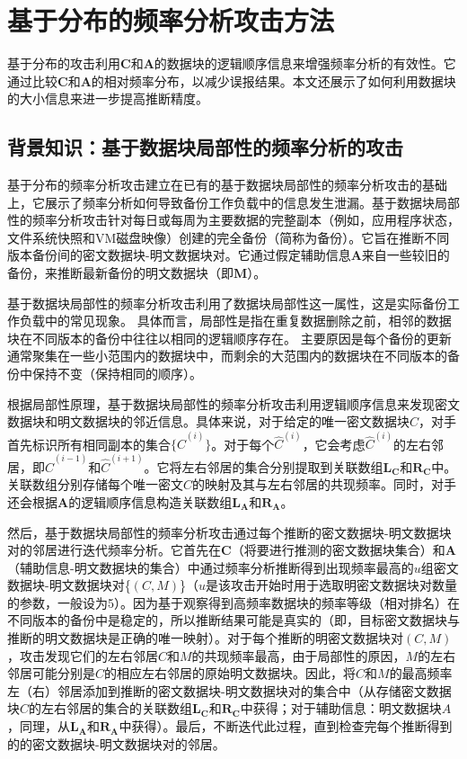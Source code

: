 \chapter{基于分布的频率分析攻击方法}
\label{sec:DistributionAttack}

基于分布的攻击利用$\mathbf{C}$和$\mathbf{A}$的数据块的逻辑顺序信息来增强频率分析的有效性。它通过比较$\mathbf{C}$和$\mathbf{A}$的相对频率分布，以减少误报结果。本文还展示了如何利用数据块的大小信息来进一步提高推断精度。

\section{背景知识：基于数据块局部性的频率分析的攻击}

\label{sec:DistributionAttack-prior-attack}

基于分布的频率分析攻击建立在已有的基于数据块局部性的频率分析攻击\cite{li2017information}的基础上，它展示了频率分析如何导致备份工作负载中的信息发生泄漏。基于数据块局部性的频率分析攻击针对每日或每周为主要数据的完整副本（例如，应用程序状态，文件系统快照和VM磁盘映像）创建的完全备份（简称为备份）。它旨在推断不同版本备份间的密文数据块-明文数据块对。它通过假定辅助信息$\mathbf{A}$来自一些较旧的备份，来推断最新备份的明文数据块（即$\mathbf{M}$）。

基于数据块局部性的频率分析攻击利用了数据块局部性这一属性\cite{xia2011silo,zhu2008avoiding,lillibridge2009sparse}，这是实际备份工作负载中的常见现象。 具体而言，局部性是指在重复数据删除之前，相邻的数据块在不同版本的备份中往往以相同的逻辑顺序存在。 主要原因是每个备份的更新通常聚集在一些小范围内的数据块中，而剩余的大范围内的数据块在不同版本的备份中保持不变（保持相同的顺序）。

根据局部性原理，基于数据块局部性的频率分析攻击利用逻辑顺序信息来发现密文数据块和明文数据块的邻近信息。具体来说，对于给定的唯一密文数据块$C$，对手首先标识所有相同副本的集合$\{\hat{C}^{(i)}\}$。对于每个$\hat{C}^{(i)}$，它会考虑$\hat{C}^{(i)}$的左右邻居，即$\hat{C}^{(i-1)}$和$\hat{C}^{(i+1)}$。它将左右邻居的集合分别提取到关联数组$\mathbf{L_C}$和$\mathbf{R_C}$中。关联数组分别存储每个唯一密文$C$的映射及其与左右邻居的共现频率。同时，对手还会根据$\mathbf{A}$的逻辑顺序信息构造关联数组$\mathbf{L_A}$和$\mathbf{R_A}$。

然后，基于数据块局部性的频率分析攻击通过每个推断的密文数据块-明文数据块对的邻居进行迭代频率分析。它首先在$\mathbf{C}$（将要进行推测的密文数据块集合）和$\mathbf{A}$（辅助信息-明文数据块的集合）中通过频率分析推断得到出现频率最高的$u$组密文数据块-明文数据块对\{$(C,M)$\}（$u$是该攻击开始时用于选取明密文数据块对数量的参数，一般设为5）。因为基于观察得到高频率数据块的频率等级（相对排名）在不同版本的备份中是稳定的，所以推断结果可能是真实的（即，目标密文数据块与推断的明文数据块是正确的唯一映射）。对于每个推断的明密文数据块对$(C,M)$，攻击发现它们的左右邻居$C$和$M$的共现频率最高，由于局部性的原因，$M$的左右邻居可能分别是$C$的相应左右邻居的原始明文数据块。因此，将$C$和$M$的最高频率左（右）邻居添加到推断的密文数据块-明文数据块对的集合中（从存储密文数据块$C$的左右邻居的集合的关联数组$\mathbf{L_C}$和$\mathbf{R_C}$中获得；对于辅助信息：明文数据块$A$，同理，从$\mathbf{L_A}$和$\mathbf{R_A}$中获得）。最后，不断迭代此过程，直到检查完每个推断得到的的密文数据块-明文数据块对的邻居。

